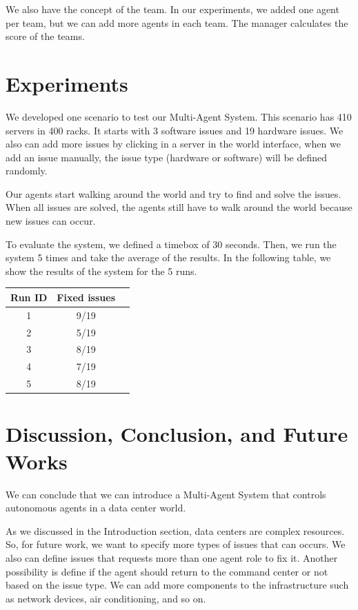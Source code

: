 \documentclass[letterpaper]{article}
\begin{document}
We also have the concept of the team. In our experiments, we added one agent per team, but we can add more agents in each team. The manager calculates the score of the teams.

\section{Experiments}\label{sec:experiments}

We developed one scenario to test our Multi-Agent System. This scenario has 410 servers in 400 racks. It starts with 3 software issues and 19 hardware issues. We also can add more issues by clicking in a server in the world interface, when we add an issue manually, the issue type (hardware or software) will be defined randomly.

Our agents start walking around the world and try to find and solve the issues. When all issues are solved, the agents still have to walk around the world because new issues can occur.

To evaluate the system, we defined a timebox of 30 seconds. Then, we run the system 5 times and take the average of the results. In the following table, we show the results of the system for the 5 runs.

\begin{center}
 \begin{tabular}{||c|c|c||} 
 \hline
 Run ID & Fixed issues \\
 \hline
 1 & 9/19 \\
 \hline
 2 & 5/19 \\
 \hline
 3 & 8/19 \\
 \hline
 4 & 7/19 \\
 \hline
 5 & 8/19 \\
 \hline
\end{tabular}
\end{center}

\section{Discussion, Conclusion, and Future Works}\label{sec:conclusions}

We can conclude that we can introduce a Multi-Agent System that controls autonomous agents in a data center world.

As we discussed in the Introduction section, data centers are complex resources. So, for future work, we want to specify more types of issues that can occurs. We also can define issues that requests more than one agent role to fix it. Another possibility is define if the agent should return to the command center or not based on the issue type. We can add more components to the infrastructure such as network devices, air conditioning, and so on.



\end{document}
